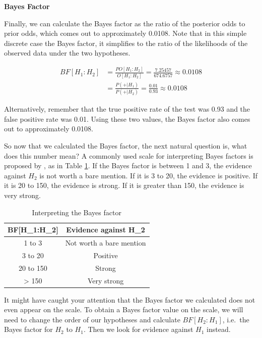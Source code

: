 \documentclass[]{book}
\theoremstyle{definition}
\theoremstyle{definition}
\theoremstyle{definition}
\theoremstyle{remark}
\begin{document}
\textbf{Bayes Factor}

Finally, we can calculate the Bayes factor as the ratio of the posterior
odds to prior odds, which comes out to approximately 0.0108. Note that
in this simple discrete case the Bayes factor, it simplifies to the
ratio of the likelihoods of the observed data under the two hypotheses.

\[\begin{aligned}
BF[H_1:H_2] &= \frac{PO[H_1:H_2]}{O[H_1:H_2]} = \frac{7.25457}{674.6757} \approx 0.0108 \\
&= \frac{P(+|H_1)}{P(+|H_2)} = \frac{0.01}{0.93} \approx 0.0108
\end{aligned}\]

Alternatively, remember that the true positive rate of the test was 0.93
and the false positive rate was 0.01. Using these two values, the Bayes
factor also comes out to approximately 0.0108.

So now that we calculated the Bayes factor, the next natural question
is, what does this number mean? A commonly used scale for interpreting
Bayes factors is proposed by \citet{jeffreys1961theory}, as in Table
\ref{tab:jeffreys1961}. If the Bayes factor is between 1 and 3, the
evidence against \(H_2\) is not worth a bare mention. If it is 3 to 20,
the evidence is positive. If it is 20 to 150, the evidence is strong. If
it is greater than 150, the evidence is very strong.

\begin{table}

\caption{\label{tab:jeffreys1961}Interpreting the Bayes factor}
\centering
\begin{tabular}[t]{cc}
\toprule
BF[H\_1:H\_2] & Evidence against H\_2\\
\midrule
1 to 3 & Not worth a bare mention\\
3 to 20 & Positive\\
20 to 150 & Strong\\
> 150 & Very strong\\
\bottomrule
\end{tabular}
\end{table}

It might have caught your attention that the Bayes factor we calculated
does not even appear on the scale. To obtain a Bayes factor value on the
scale, we will need to change the order of our hypotheses and calculate
\(BF[H_2:H_1]\), i.e.~the Bayes factor for \(H_2\) to \(H_1\). Then we
look for evidence against \(H_1\) instead.
\end{document}
